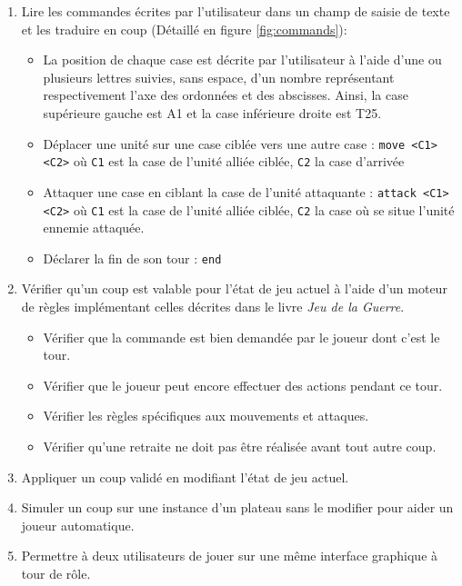 \documentclass[a4paper]{report}
\begin{document}
\begin{enumerate}

\item Lire les commandes écrites par l'utilisateur dans un champ de saisie de texte et les traduire en coup (Détaillé en figure \ref{fig:commands}):
	\begin{itemize}
    \item La position de chaque case est décrite par l'utilisateur à l'aide d'une ou plusieurs lettres suivies, sans espace, d'un nombre représentant respectivement l'axe des ordonnées et des abscisses. Ainsi, la case supérieure gauche est A1 et la case inférieure droite est T25.
	\item Déplacer une unité sur une case ciblée vers une autre case : \texttt{move <C1> <C2>} où \texttt{C1} est la case de l'unité alliée ciblée, \texttt{C2} la case d'arrivée
    \item Attaquer une case en ciblant la case de l'unité attaquante : \texttt{attack <C1> <C2>} où \texttt{C1} est la case de l'unité alliée ciblée, \texttt{C2} la case où se situe l'unité ennemie attaquée.
    \item Déclarer la fin de son tour : \texttt{end}
	\end{itemize}

\item Vérifier qu'un coup est valable pour l'état de jeu actuel à l'aide d'un moteur de règles implémentant celles décrites dans le livre \textit{Jeu de la Guerre}.
	\begin{itemize}
    \item Vérifier que la commande est bien demandée par le joueur dont c'est le tour.
    \item Vérifier que le joueur peut encore effectuer des actions pendant ce tour.
    \item Vérifier les règles spécifiques aux mouvements et attaques.
    \item Vérifier qu'une retraite ne doit pas être réalisée avant tout autre coup.
	\end{itemize}
    
\item Appliquer un coup validé en modifiant l'état de jeu actuel.
    
\item Simuler un coup sur une instance d'un plateau sans le modifier pour aider un joueur automatique.

\item Permettre à deux utilisateurs de jouer sur une même interface graphique à tour de rôle.


\end{enumerate}
\end{document}
